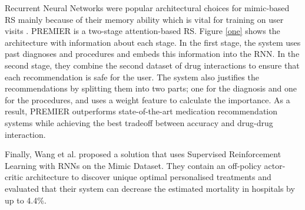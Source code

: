 Recurrent Neural Networks were popular architectural choices for mimic-based RS
mainly because of their memory ability which is vital for training on user
visits \cite{Wang}. PREMIER \cite{Bhoi2021} is a two-stage attention-based
RS. Figure \ref{one} shows the architecture with information about each stage. In
the first stage, the system uses past diagnoses and procedures and embeds
this information into the RNN. In the second stage, they combine the
second dataset of drug interactions to ensure that each recommendation is
safe for the user. The system also justifies the recommendations by
splitting them into two parts; one for the diagnosis and one for the
procedures, and uses a weight feature to calculate the importance. As a
result, PREMIER outperforms state-of-the-art medication recommendation
systems while achieving the best tradeoff between accuracy and drug-drug
interaction.  

Finally, Wang et al. \cite{Wang} proposed a solution that uses Supervised Reinforcement
Learning with RNNs on the Mimic Dataset. They contain an off-policy
actor-critic architecture to discover unique optimal personalised
treatments and evaluated that their system can decrease the estimated
mortality in hospitals by up to 4.4\%.

